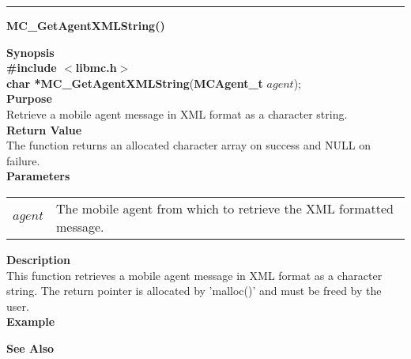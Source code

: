 \noindent
\vspace{5pt}
\rule{6.5in}{0.015in}
\noindent
{\LARGE \bf MC\_GetAgentXMLString()}\\
{}
\label{api:MC_GetAgentXMLString}

\noindent
{\bf Synopsis}\\
{\bf \#include $<$libmc.h$>$}\\
{\bf char *MC\_GetAgentXMLString}({\bf MCAgent\_t} $agent$);\\

\noindent
{\bf Purpose}\\
Retrieve a mobile agent message in XML format as a character string.\\

\noindent
{\bf Return Value}\\
The function returns an allocated character array on success and NULL on 
failure.\\

\noindent
{\bf Parameters}
\vspace{-0.1in}
\begin{description}
\item               
\begin{tabular}{p{10 mm}p{145 mm}}
$agent$ & The mobile agent from which to retrieve the XML formatted message.
\end{tabular}
\end{description}

\noindent
{\bf Description}\\
This function retrieves a mobile agent message in XML format as a character 
string. 
The return pointer is allocated by 'malloc()' and must be freed by the user.\\

\noindent
{\bf Example}\\
\noindent
{\footnotesize}

\noindent
{\bf See Also}\\


